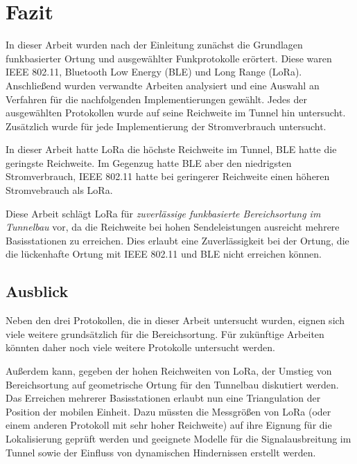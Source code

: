 \chapter{Fazit}
\label{ch:Fazit}
In dieser Arbeit wurden nach der Einleitung zunächst die Grundlagen funkbasierter Ortung und ausgewählter Funkprotokolle erörtert.
Diese waren IEEE 802.11, Bluetooth Low Energy (BLE) und Long Range (LoRa).
Anschließend wurden verwandte Arbeiten analysiert und eine Auswahl an Verfahren für die nachfolgenden Implementierungen gewählt.
Jedes der ausgewählten Protokollen wurde auf seine Reichweite im Tunnel hin untersucht.
Zusätzlich wurde für jede Implementierung der Stromverbrauch untersucht.

In dieser Arbeit hatte LoRa die höchste Reichweite im Tunnel, BLE hatte die geringste Reichweite.
Im Gegenzug hatte BLE aber den niedrigsten Stromverbrauch, IEEE 802.11 hatte bei geringerer Reichweite einen höheren Stromvebrauch als LoRa.

Diese Arbeit schlägt LoRa für \emph{zuverlässige funkbasierte Bereichsortung im Tunnelbau} vor, da die Reichweite bei hohen Sendeleistungen ausreicht mehrere Basisstationen zu erreichen. 
Dies erlaubt eine Zuverlässigkeit bei der Ortung, die die lückenhafte Ortung mit IEEE 802.11 und BLE nicht erreichen können.

\section{Ausblick}
Neben den drei Protokollen, die in dieser Arbeit untersucht wurden, eignen sich viele weitere grundsätzlich für die Bereichsortung.
Für zukünftige Arbeiten könnten daher noch viele weitere Protokolle untersucht werden. 

Außerdem kann, gegeben der hohen Reichweiten von LoRa, der Umstieg von Bereichsortung auf geometrische Ortung für den Tunnelbau diskutiert werden. 
Das Erreichen mehrerer Basisstationen erlaubt nun eine Triangulation der Position der mobilen Einheit.
Dazu müssten die Messgrößen von LoRa (oder einem anderen Protokoll mit sehr hoher Reichweite) auf ihre Eignung für die Lokalisierung geprüft werden und geeignete Modelle für die Signalausbreitung im Tunnel sowie der Einfluss von dynamischen Hindernissen erstellt werden.


